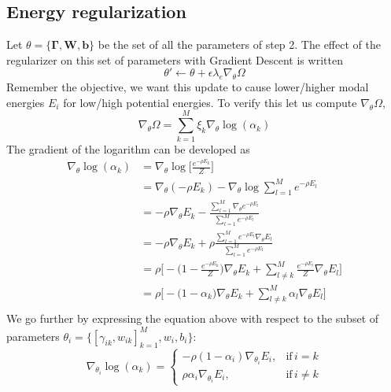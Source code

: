 \subsection*{Energy regularization}
Let $\theta = \{ \bm{\Gamma}, \mathbf{W}, \mathbf{b}\}$ be the set of all the parameters of step 2. The effect of the regularizer on this set of parameters with Gradient Descent is written
\begin{equation}
\theta' \leftarrow \theta + \epsilon\lambda_e\nabla_\theta\Omega
\label{eq:update}
\end{equation}
Remember the objective, we want this update to cause lower/higher modal energies $E_i$ for low/high potential energies. To verify this let us compute $\nabla_\theta\Omega$,
\begin{equation}
\nabla_{\theta} \Omega =\sum_{k=1}^M \xi_k \nabla_{\theta} \log(\alpha_k) 
\label{eq:dev}
\end{equation}
The gradient of the logarithm can be developed as
\begin{equation}
\begin{split}  
\nabla_{\theta}  \log(\alpha_k) &= \nabla_{\theta} \log \bigg[ \frac{e^{-\rho E_k}}{Z} \bigg] \\
&=  \nabla_{\theta}(-\rho E_k) -  \nabla_{\theta} \log \sum_{l=1}^M e^{-\rho E_l} \\
&=  -\rho \nabla_{\theta}E_k - \frac{\sum_{l=1}^M \nabla_{\theta} e^{-\rho E_l}}{\sum_{l=1}^M e^{-\rho E_l}} \\
&= -\rho \nabla_{\theta}E_k + \rho \frac{\sum_{l=1}^M e^{-\rho E_l} \nabla_{\theta}E_l}{\sum_{l=1}^M e^{-\rho E_l}} \\
&= \rho \Bigg[ -\big(1 - \frac{e^{-\rho E_k}}{Z}\big)\nabla_{\theta}E_k + \sum_{l \neq k}^M \frac{e^{-\rho E_l}}{Z} \nabla_{\theta}E_l \Bigg] \\
&= \rho \Bigg[ -\big(1 - \alpha_k\big)\nabla_{\theta}E_k + \sum_{l \neq k}^M \alpha_l \nabla_{\theta}E_l \Bigg] \\
\end{split}
\label{eq:grad-log}
\end{equation}
We go further by expressing the equation above with respect to the subset of parameters $\theta_i = \{[\gamma_{ik}, w_{ik}]_{k=1}^M, w_i, b_i\}$:
\begin{equation}
\nabla_{\theta_i}  \log(\alpha_k) = \begin{cases}
      -\rho(1-\alpha_i)\nabla_{\theta_i}E_i, & \text{if}\, i = k \\
       \rho\alpha_i\nabla_{\theta_i}E_i, & \text{if}\, i \neq k
    \end{cases}
\label{eq:log-split}
\end{equation}

